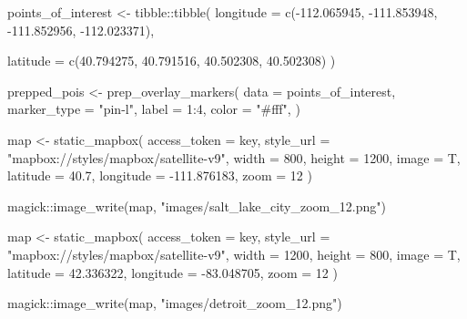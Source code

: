 \documentclass[
  letterpaper,
]{report}
\newenvironment{Shaded}{\begin{snugshade}}{\end{snugshade}}
\newcommand{\AttributeTok}[1]{\textcolor[rgb]{0.40,0.45,0.13}{#1}}
\newcommand{\DecValTok}[1]{\textcolor[rgb]{0.68,0.00,0.00}{#1}}
\newcommand{\FloatTok}[1]{\textcolor[rgb]{0.68,0.00,0.00}{#1}}
\newcommand{\FunctionTok}[1]{\textcolor[rgb]{0.28,0.35,0.67}{#1}}
\newcommand{\NormalTok}[1]{\textcolor[rgb]{0.00,0.23,0.31}{#1}}
\newcommand{\OtherTok}[1]{\textcolor[rgb]{0.00,0.23,0.31}{#1}}
\newcommand{\SpecialCharTok}[1]{\textcolor[rgb]{0.37,0.37,0.37}{#1}}
\newcommand{\StringTok}[1]{\textcolor[rgb]{0.13,0.47,0.30}{#1}}
\begin{document}
\begin{Shaded}
\begin{Highlighting}[]
\NormalTok{points\_of\_interest }\OtherTok{\textless{}{-}}\NormalTok{ tibble}\SpecialCharTok{::}\FunctionTok{tibble}\NormalTok{(}
  \AttributeTok{longitude =} \FunctionTok{c}\NormalTok{(}\SpecialCharTok{{-}}\FloatTok{112.065945}\NormalTok{, }\SpecialCharTok{{-}}\FloatTok{111.853948}\NormalTok{, }
                \SpecialCharTok{{-}}\FloatTok{111.852956}\NormalTok{, }\SpecialCharTok{{-}}\FloatTok{112.023371}\NormalTok{),}
  
  \AttributeTok{latitude =} \FunctionTok{c}\NormalTok{(}\FloatTok{40.794275}\NormalTok{, }\FloatTok{40.791516}\NormalTok{, }
               \FloatTok{40.502308}\NormalTok{, }\FloatTok{40.502308}\NormalTok{)}
\NormalTok{  )}

\NormalTok{prepped\_pois }\OtherTok{\textless{}{-}} \FunctionTok{prep\_overlay\_markers}\NormalTok{(}
  \AttributeTok{data =}\NormalTok{ points\_of\_interest,}
  \AttributeTok{marker\_type =} \StringTok{"pin{-}l"}\NormalTok{,}
  \AttributeTok{label =} \DecValTok{1}\SpecialCharTok{:}\DecValTok{4}\NormalTok{,}
  \AttributeTok{color =} \StringTok{"\#fff"}\NormalTok{, }
\NormalTok{)}

\NormalTok{map }\OtherTok{\textless{}{-}} \FunctionTok{static\_mapbox}\NormalTok{(}
  \AttributeTok{access\_token =}\NormalTok{ key,}
  \AttributeTok{style\_url =} \StringTok{"mapbox://styles/mapbox/satellite{-}v9"}\NormalTok{,}
  \AttributeTok{width =} \DecValTok{800}\NormalTok{,}
  \AttributeTok{height =} \DecValTok{1200}\NormalTok{, }
  \AttributeTok{image =}\NormalTok{ T, }
  \AttributeTok{latitude =} \FloatTok{40.7}\NormalTok{,}
  \AttributeTok{longitude =} \SpecialCharTok{{-}}\FloatTok{111.876183}\NormalTok{, }\AttributeTok{zoom =} \DecValTok{12}
\NormalTok{)}

\NormalTok{magick}\SpecialCharTok{::}\FunctionTok{image\_write}\NormalTok{(map, }\StringTok{"images/salt\_lake\_city\_zoom\_12.png"}\NormalTok{)}
\end{Highlighting}
\end{Shaded}

\begin{Shaded}
\begin{Highlighting}[]
\NormalTok{map }\OtherTok{\textless{}{-}} \FunctionTok{static\_mapbox}\NormalTok{(}
  \AttributeTok{access\_token =}\NormalTok{ key,}
  \AttributeTok{style\_url =} \StringTok{"mapbox://styles/mapbox/satellite{-}v9"}\NormalTok{,}
  \AttributeTok{width =} \DecValTok{1200}\NormalTok{,}
  \AttributeTok{height =} \DecValTok{800}\NormalTok{, }
  \AttributeTok{image =}\NormalTok{ T, }
  \AttributeTok{latitude =} \FloatTok{42.336322}\NormalTok{,}
  \AttributeTok{longitude =} \SpecialCharTok{{-}}\FloatTok{83.048705}\NormalTok{, }\AttributeTok{zoom =} \DecValTok{12}
\NormalTok{)}

\NormalTok{magick}\SpecialCharTok{::}\FunctionTok{image\_write}\NormalTok{(map, }\StringTok{"images/detroit\_zoom\_12.png"}\NormalTok{)}
\end{Highlighting}
\end{Shaded}
\end{document}
